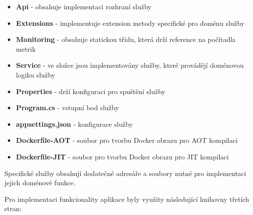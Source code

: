   \begin{itemize}
    \item \textbf{Api} - obsahuje implementaci rozhraní služby
    \item \textbf{Extensions} - implementuje extension metody specifické pro doménu služby
    \item \textbf{Monitoring} - obsahuje statickou třídu, která drží reference na počítadla metrik
    \item \textbf{Service} - ve složce jsou implementovány služby, které provádějí doménovou logiku služby
    \item \textbf{Properties} - drží konfiguraci pro spuštění služby
    \item \textbf{Program.cs} - vstupní bod služby
    \item \textbf{appsettings.json} - konfigurace služby
    \item \textbf{Dockerfile-AOT} - soubor pro tvorbu Docker obrazu pro AOT kompilaci
    \item \textbf{Dockerfile-JIT} - soubor pro tvorbu Docker obrazu pro JIT kompilaci
\end{itemize}

Specifické služby obsahují dodatečné adresáře a soubory nutné pro implementaci jejich doménové funkce.


Pro implementaci funkcionality aplikace byly využity následující knihovny třetích stran:

